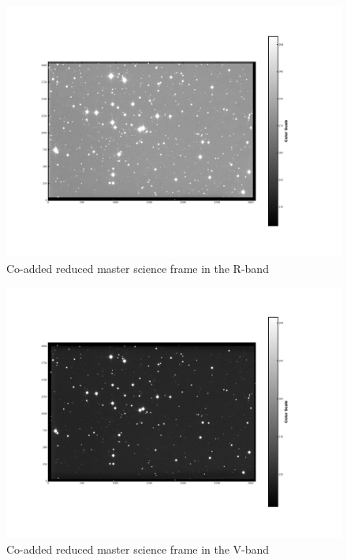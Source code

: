\documentclass[12pt]{article}
\begin{document}
    \begin{figure}[H]
    \centering
    \includegraphics[width=\textwidth]{fig/Co-added_reduced_master_R.png}
    \caption{ Co-added reduced master science frame in the R-band}

    \end{figure}

    \begin{figure}[H]
    \centering
    \includegraphics[width=\textwidth]{fig/Co-added_reduced_master_V.png}
    \caption{ Co-added reduced master science frame in the V-band}

    \end{figure}
\end{document}
